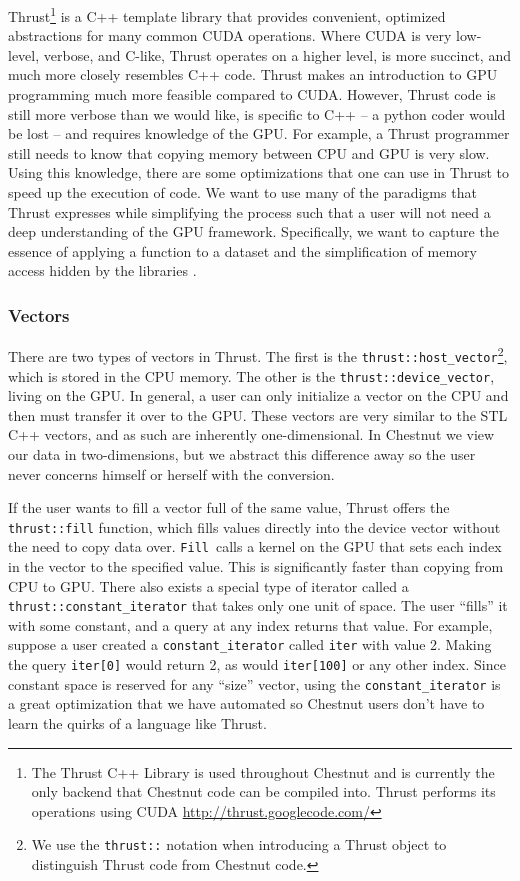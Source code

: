 \documentclass[twocolumn]{article}
\renewcommand{\|}{\origbar} %
\newcommand{\code}[1]{\texttt{#1}}
\begin{document}
Thrust\footnote{The Thrust C++ Library is used throughout Chestnut and is currently the only backend that Chestnut code can be compiled into. Thrust performs its operations using CUDA \url{http://thrust.googlecode.com/}} is a C++ template library that provides convenient, optimized abstractions for many common CUDA operations. Where CUDA is very low-level, verbose, and C-like, Thrust operates on a higher level, is more succinct, and much more closely resembles C++ code. Thrust makes an introduction to GPU programming much more feasible compared to CUDA. However, Thrust code is still more verbose than we would like, is specific to C++ -- a python coder would be lost -- and requires knowledge of the GPU. For example, a Thrust programmer still needs to know that copying memory between CPU and GPU is very slow. Using this knowledge, there are some optimizations that one can use in Thrust to speed up the execution of code. We want to use many of the paradigms that Thrust expresses while simplifying the process such that a user will not need a deep understanding of the GPU framework. Specifically, we want to capture the essence of applying a function to a dataset and the simplification of memory access hidden by the libraries \cite{hoberock}.

\subsubsection{Vectors}

There are two types of vectors in Thrust. The first is the \code{thrust::host\_vector}\footnote{We use the \code{thrust::} notation when introducing a Thrust object to distinguish Thrust code from Chestnut code.}, which is stored in the CPU memory. The other is the \code{thrust::device\_vector}, living on the GPU. In general, a user can only initialize a vector on the CPU and then must transfer it over to the GPU. These vectors are very similar to the STL C++ vectors, and as such are inherently one-dimensional. In Chestnut we view our data in two-dimensions, but we abstract this difference away so the user never concerns himself or herself with the conversion. 

If the user wants to fill a vector full of the same value, Thrust offers the \code{thrust::fill} function, which fills values directly into the device vector without the need to copy data over. \code{Fill}~calls a kernel on the GPU that sets each index in the vector to the specified value. This is significantly faster than copying from CPU to GPU. There also exists a special type of iterator called a \code{thrust::constant\_iterator} that takes only one unit of space. The user ``fills'' it with some constant, and a query at any index returns that value. For example, suppose a user created a \code{constant\_iterator} called \code{iter} with value 2. Making the query \code{iter[0]} would return 2, as would \code{iter[100]} or any other index. Since constant space is reserved for any ``size'' vector, using  the \code{constant\_iterator} is a great optimization that we have automated so Chestnut users don't have to learn the quirks of a language like Thrust. 
\end{document}
